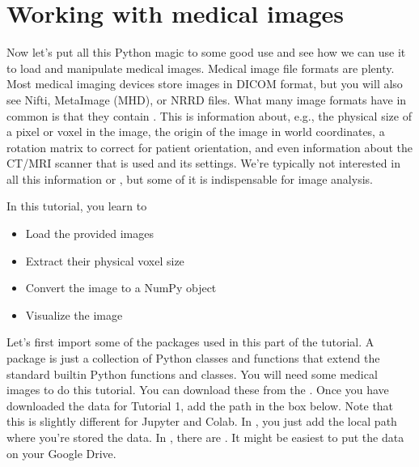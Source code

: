 \documentclass[letterpaper,10pt,english]{jupyterBook}
\begin{document}
\chapter{Working with medical images}
\label{\detokenize{notebooks/Tutorial1_NumpySimpleITK/Tutorial1_NumpySimpleITK_student:working-with-medical-images}}
\sphinxAtStartPar
Now let’s put all this Python magic to some good use and see how we can use it to load and manipulate medical images. Medical image file formats are plenty. Most medical imaging devices store images in DICOM format, but you will also see Nifti, MetaImage (MHD), or NRRD files. What many image formats have in common is that they contain . This is information about, e.g., the physical size of a pixel or voxel in the image, the origin of the image in world coordinates, a rotation matrix to correct for patient orientation, and even information about the CT/MRI scanner that is used and its settings. We’re typically not interested in all this information or , but some of it is indispensable for image analysis.

\sphinxAtStartPar
In this tutorial, you learn to
\begin{itemize}
\item {} 
\sphinxAtStartPar
Load the provided images

\item {} 
\sphinxAtStartPar
Extract their physical voxel size

\item {} 
\sphinxAtStartPar
Convert the image to a NumPy  object

\item {} 
\sphinxAtStartPar
Visualize the image

\end{itemize}

\sphinxAtStartPar
Let’s first import some of the packages used in this part of the tutorial. A package is just a collection of Python classes and functions that extend the standard built\sphinxhyphen{}in Python functions and classes. You will need some medical images to do this tutorial. You can download these from the . Once you have downloaded the data for Tutorial 1, add the path in the box below. Note that this is slightly different for Jupyter and Colab. In , you just add the local path where you’re stored the data. In , there are . It might be easiest to put the data on your Google Drive.
\end{document}
